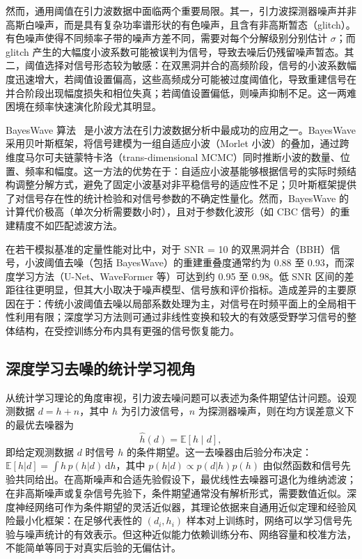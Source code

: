 然而，通用阈值在引力波数据中面临两个重要局限。其一，引力波探测器噪声并非高斯白噪声，而是具有复杂功率谱形状的有色噪声，且含有非高斯暂态（glitch）。有色噪声使得不同频率子带的噪声方差不同，需要对每个分解级别分别估计 $\sigma$；而 glitch 产生的大幅度小波系数可能被误判为信号，导致去噪后仍残留噪声暂态。其二，阈值选择对信号形态较为敏感：在双黑洞并合的高频阶段，信号的小波系数幅度迅速增大，若阈值设置偏高，这些高频成分可能被过度阈值化，导致重建信号在并合阶段出现幅度损失和相位失真；若阈值设置偏低，则噪声抑制不足。这一两难困境在频率快速演化阶段尤其明显。

BayesWave 算法~\cite{Cornish2015BayesWave} 是小波方法在引力波数据分析中最成功的应用之一。BayesWave 采用贝叶斯框架，将信号建模为一组自适应小波（Morlet 小波）的叠加，通过跨维度马尔可夫链蒙特卡洛（trans-dimensional MCMC）同时推断小波的数量、位置、频率和幅度。这一方法的优势在于：自适应小波基能够根据信号的实际时频结构调整分解方式，避免了固定小波基对非平稳信号的适应性不足；贝叶斯框架提供了对信号存在性的统计检验和对信号参数的不确定性量化。然而，BayesWave 的计算代价极高（单次分析需要数小时），且对于参数化波形（如 CBC 信号）的重建精度不如匹配滤波方法。

在若干模拟基准的定量性能对比中，对于 SNR = 10 的双黑洞并合（BBH）信号，小波阈值去噪（包括 BayesWave）的重建重叠度通常约为 0.88 至 0.93，而深度学习方法（U-Net、WaveFormer 等）可达到约 0.95 至 0.98。低 SNR 区间的差距往往更明显，但其大小取决于噪声模型、信号族和评价指标。造成差异的主要原因在于：传统小波阈值去噪以局部系数处理为主，对信号在时频平面上的全局相干性利用有限；深度学习方法则可通过非线性变换和较大的有效感受野学习信号的整体结构，在受控训练分布内具有更强的信号恢复能力。

\subsection{深度学习去噪的统计学习视角}

从统计学习理论的角度审视，引力波去噪问题可以表述为条件期望估计问题。设观测数据 $d = h + n$，其中 $h$ 为引力波信号，$n$ 为探测器噪声，则在均方误差意义下的最优去噪器为
\begin{equation}
  \hat{h}(d) = \mathbb{E}[h \mid d],
\end{equation}
即给定观测数据 $d$ 时信号 $h$ 的条件期望。这一去噪器由后验分布决定：$\mathbb{E}[h|d] = \int h \, p(h|d) \, \mathrm{d}h$，其中 $p(h|d) \propto p(d|h) p(h)$ 由似然函数和信号先验共同给出。在高斯噪声和合适先验假设下，最优线性去噪器可退化为维纳滤波；在非高斯噪声或复杂信号先验下，条件期望通常没有解析形式，需要数值近似。深度神经网络可作为条件期望的灵活近似器，其理论依据来自通用近似定理和经验风险最小化框架：在足够代表性的 $(d_i, h_i)$ 样本对上训练时，网络可以学习信号先验与噪声统计的有效表示。但这种近似能力依赖训练分布、网络容量和校准方法，不能简单等同于对真实后验的无偏估计。

